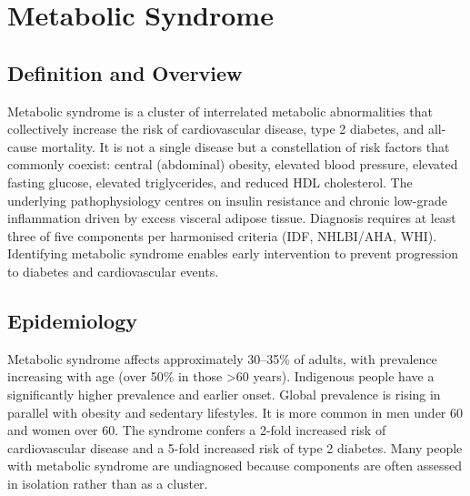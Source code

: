 \chapter{Metabolic Syndrome}

\section*{Definition and Overview}
Metabolic syndrome is a cluster of interrelated metabolic abnormalities that collectively increase the risk of cardiovascular disease, type 2 diabetes, and all-cause mortality. It is not a single disease but a constellation of risk factors that commonly coexist: central (abdominal) obesity, elevated blood pressure, elevated fasting glucose, elevated triglycerides, and reduced HDL cholesterol. The underlying pathophysiology centres on insulin resistance and chronic low-grade inflammation driven by excess visceral adipose tissue. Diagnosis requires at least three of five components per harmonised criteria (IDF, NHLBI/AHA, WHI). Identifying metabolic syndrome enables early intervention to prevent progression to diabetes and cardiovascular events.

\section*{Epidemiology}
Metabolic syndrome affects approximately 30--35\% of adults, with prevalence increasing with age (over 50\% in those >60 years). Indigenous people have a significantly higher prevalence and earlier onset. Global prevalence is rising in parallel with obesity and sedentary lifestyles. It is more common in men under 60 and women over 60. The syndrome confers a 2-fold increased risk of cardiovascular disease and a 5-fold increased risk of type 2 diabetes. Many people with metabolic syndrome are undiagnosed because components are often assessed in isolation rather than as a cluster.

